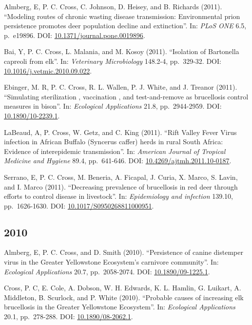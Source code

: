 \documentclass[12pt,]{article}
\begin{document}
Almberg, E, P. C. Cross, C. Johnson, D. Heisey, and B. Richards (2011).
``Modeling routes of chronic wasting disease transmission: Environmental
prion persistence promotes deer population decline and extinction''. In:
\emph{PLoS ONE} 6.5, p.~e19896. DOI:
\href{https://doi.org/10.1371\%2Fjournal.pone.0019896}{10.1371/journal.pone.0019896}.

Bai, Y, P. C. Cross, L. Malania, and M. Kosoy (2011). ``Isolation of
Bartonella capreoli from elk''. In: \emph{Veterinary Microbiology}
148.2-4, pp.~329-32. DOI:
\href{https://doi.org/10.1016\%2Fj.vetmic.2010.09.022}{10.1016/j.vetmic.2010.09.022}.

Ebinger, M. R, P. C. Cross, R. L. Wallen, P. J. White, and J. Treanor
(2011). ``Simulating sterilization , vaccination , and test-and-remove
as brucellosis control measures in bison''. In: \emph{Ecological
Applications} 21.8, pp.~2944-2959. DOI:
\href{https://doi.org/10.1890\%2F10-2239.1}{10.1890/10-2239.1}.

LaBeaud, A, P. Cross, W. Getz, and C. King (2011). ``Rift Valley Fever
Virus infection in African Buffalo (Syncerus caffer) herds in rural
South Africa: Evidence of interepidemic transmission''. In:
\emph{American Journal of Tropical Medicine and Hygiene} 89.4,
pp.~641-646. DOI:
\href{https://doi.org/10.4269\%2Fajtmh.2011.10-0187}{10.4269/ajtmh.2011.10-0187}.

Serrano, E, P. C. Cross, M. Beneria, A. Ficapal, J. Curia, X. Marco, S.
Lavin, and I. Marco (2011). ``Decreasing prevalence of brucellosis in
red deer through efforts to control disease in livestock''. In:
\emph{Epidemiology and infection} 139.10, pp.~1626-1630. DOI:
\href{https://doi.org/10.1017\%2FS0950268811000951}{10.1017/S0950268811000951}.

\hypertarget{section-9}{%
\subsection{2010}\label{section-9}}

Almberg, E, P. C. Cross, and D. Smith (2010). ``Persistence of canine
distemper virus in the Greater Yellowstone Ecosystem's carnivore
community''. In: \emph{Ecological Applications} 20.7, pp.~2058-2074.
DOI: \href{https://doi.org/10.1890\%2F09-1225.1}{10.1890/09-1225.1}.

Cross, P. C, E. Cole, A. Dobson, W. H. Edwards, K. L. Hamlin, G.
Luikart, A. Middleton, B. Scurlock, and P. White (2010). ``Probable
causes of increasing elk brucellosis in the Greater Yellowstone
Ecosystem''. In: \emph{Ecological Applications} 20.1, pp.~278-288. DOI:
\href{https://doi.org/10.1890\%2F08-2062.1}{10.1890/08-2062.1}.
\end{document}
